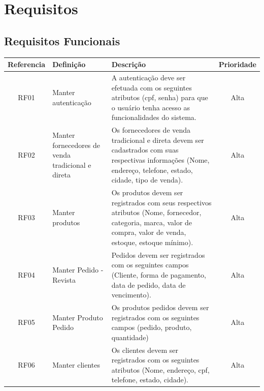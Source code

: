 \documentclass[chapter=TITLE,12pt,oneside,a4paper,english,french,sumario=tradicional,spanish,brazil,]{abntex2}
\begin{document}
\chapter{Requisitos}
\vspace{-0.6cm}
\section{Requisitos Funcionais}
\renewcommand\tabularxcolumn[1]{m{#1}}
\begin{table}[!htpb]
    \begin{center}
        \begin{tabularx}{\textwidth}{|c|p{3cm}|X|c|}
        \rowcolor[gray]{0.9}
        \hline
        Referencia &
        Definição &
        Descrição &
        Prioridade \\

        \hline
        RF01 &
        Manter autenticação &
        A autenticação deve ser efetuada com os seguintes atributos (cpf, senha) para que o usuário tenha acesso as funcionalidades do sistema. &
        Alta \\

        \hline
        RF02 &
        Manter fornecedores de venda tradicional e direta &
        Os fornecedores de venda tradicional e direta devem ser cadastrados com suas respectivas informações (Nome, endereço, telefone, estado, cidade, tipo de venda).&
        Alta \\

        \hline
        RF03 &
        Manter produtos &
        Os produtos devem ser registrados com seus respectivos atributos (Nome, fornecedor, categoria, marca, valor de compra, valor de venda, estoque, estoque mínimo).&
        Alta \\

        \hline
        RF04 &
        Manter Pedido - Revista &
        Pedidos devem ser registrados com os seguintes campos (Cliente, forma de pagamento, data de pedido, data de vencimento).&
        Alta \\

        \hline
        RF05 &
        Manter Produto Pedido &
        Os produtos pedidos devem ser registrados com os seguintes campos (pedido, produto, quantidade)&
        Alta \\

        \hline
        RF06 &
        Manter clientes &
        Os clientes devem ser registrados com os seguintes atributos (Nome, endereço, cpf,  telefone, estado, cidade).&
        Alta \\


\end{tabularx}
\end{center}
\end{table}
\end{document}
